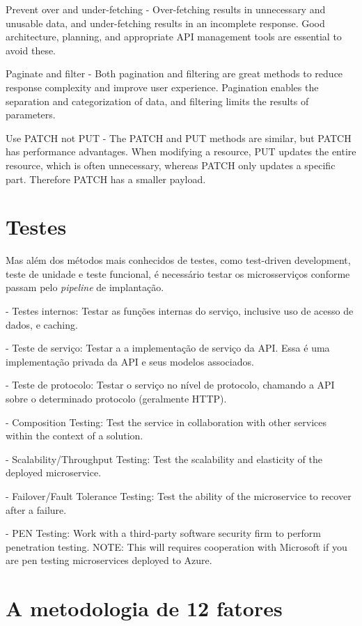 Prevent over and under-fetching - Over-fetching results in unnecessary and unusable data, and under-fetching results in an incomplete response. Good architecture, planning, and appropriate API management tools are essential to avoid these.

Paginate and filter - Both pagination and filtering are great methods to reduce response complexity and improve user experience. Pagination enables the separation and categorization of data, and filtering limits the results of parameters.

Use PATCH not PUT - The PATCH and PUT methods are similar, but PATCH has performance advantages. When modifying a resource, PUT updates the entire resource, which is often unnecessary, whereas PATCH only updates a specific part. Therefore PATCH has a smaller payload. \cite{rapidAPI-optimization}

\section{Testes}

Mas além dos métodos mais conhecidos de testes, como test-driven development, teste de unidade e teste funcional, é necessário testar os microsserviços conforme passam pelo \emph{pipeline} de implantação.

- Testes internos: Testar as funções internas do serviço, inclusive uso de acesso de dados, e caching.

- Teste de serviço: Testar a a implementação de serviço da API. Essa é uma implementação privada da API e seus modelos associados.

- Teste de protocolo: Testar o serviço no nível de protocolo, chamando a API sobre o determinado protocolo (geralmente HTTP).

- Composition Testing: Test the service in collaboration with other services within the context of a solution.

- Scalability/Throughput Testing: Test the scalability and elasticity of the deployed microservice.

- Failover/Fault Tolerance Testing: Test the ability of the microservice to recover after a failure.

- PEN Testing: Work with a third-party software security firm to perform penetration testing. NOTE: This will requires cooperation with Microsoft if you are pen testing microservices deployed to Azure.

\section{A metodologia de 12 fatores}

